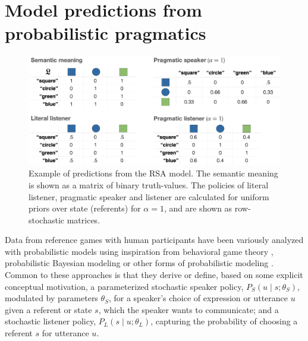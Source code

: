 \documentclass[fleqn]{article}
\begin{document}
\section{Model predictions from probabilistic pragmatics}
\label{sec:model-pred-from}

\begin{figure}[t]
  \centering
  \includegraphics[width = 0.9 \textwidth]{00-pics/RSA-example.png}
  \caption{
    Example of predictions from the RSA model.
    The semantic meaning is shown as a matrix of binary truth-values.
    The policies of literal listener, pragmatic speaker and listener are calculated for uniform priors over state (referents) for $\alpha=1$, and are shown as row-stochastic matrices.
  }
  \label{fig:RSA-example}
\end{figure}

Data from reference games with human participants have been variously analyzed with probabilistic models using inspiration from behavioral game theory \citep[e.g.,][]{DegenFranke2013:Cost-Based-Prag}, probabilistic Bayesian modeling \citep[e.g.,][]{FrankGoodman2012:Predicting-Prag} or other forms of probabilistic modeling \citep[e.g.,][]{GattGompel2013:Are-we-Bayesian}.
Common to these approaches is that they derive or define, based on some explicit conceptual motivation, a parameterized stochastic speaker policy, $P_{S}(u \mid s; \theta_{S})$, modulated by parameters $\theta_{S}$, for a speaker's choice of expression or utterance $u$ given a referent or state $s$, which the speaker wants to communicate;
and a stochastic listener policy, $P_{L}(s \mid u; \theta_{L})$, capturing the probability of choosing a referent $s$ for utterance $u$.
\end{document}
